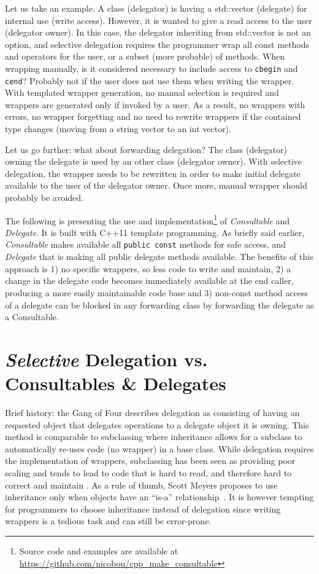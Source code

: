 \documentclass{article}
\begin{document}
Let us take an example. A class (delegator) is having a std::vector (delegate) for internal use (write access). However, it is wanted to give a read access to the user (delegator owner). In this case, the delegator inheriting from std::vector is not an option, and selective delegation requires the programmer wrap all const methods and operators for the user, or a subset (more probable) of methods. When wrapping manually, is it considered necessary to include access to \verb+cbegin+ and \verb+cend+? Probably not if the user does not use them when writing the wrapper. With templated wrapper generation, no manual selection is required and wrappers are generated only if invoked by a user. As a result, no wrappers with errors, no wrapper forgetting and no need to rewrite wrappers if the contained type changes (moving from a string vector to an int vector).  

Let us go further: what about forwarding delegation? The class (delegator) owning the delegate is used by an other class (delegator owner). With selective delegation, the wrapper needs to be rewritten in order to make initial delegate available to the user of the delegator owner. Once more, manual wrapper should probably be avoided. 

The following is presenting the use and implementation\footnote{Source code and examples are available at \url{https://github.com/nicobou/cpp_make_consultable}} of \textit{Consultable} and \textit{Delegate}. It is built with C++11 template programming. As briefly said earlier, \textit{Consultable} makes available all \verb+public const+ methods for safe access, and \textit{Delegate} that is making all public delegate methods available. The benefits of this approach is 1) no specific wrappers, so less code to write and maintain, 2) a change in the delegate code becomes immediately available at the end caller, producing a more easily maintainable code base and 3) non-const method access of a delegate can be blocked in any forwarding class by forwarding the delegate as a Consultable. 

\section{\textit{Selective} Delegation vs. Consultables \& Delegates}
Brief history: the Gang of Four\cite{1995gamma} describes delegation as consisting of having an requested object that delegates operations to a delegate object it is owning. This method is comparable to subclassing where inheritance allows for a subclass to automatically re-uses code (no wrapper) in a base class.  While delegation requires the implementation of wrappers, subclassing has been seen as providing poor scaling and tends to lead to code that is hard to read, and therefore hard to correct and maintain \cite{2007cser}. As a rule of thumb, Scott Meyers proposes to use inheritance only when objects have an ``is-a'' relationship~\cite{2005Meyers}. It is however tempting for programmers to choose inheritance instead of delegation since writing wrappers is a tedious task and can still be error-prone.
\end{document}
